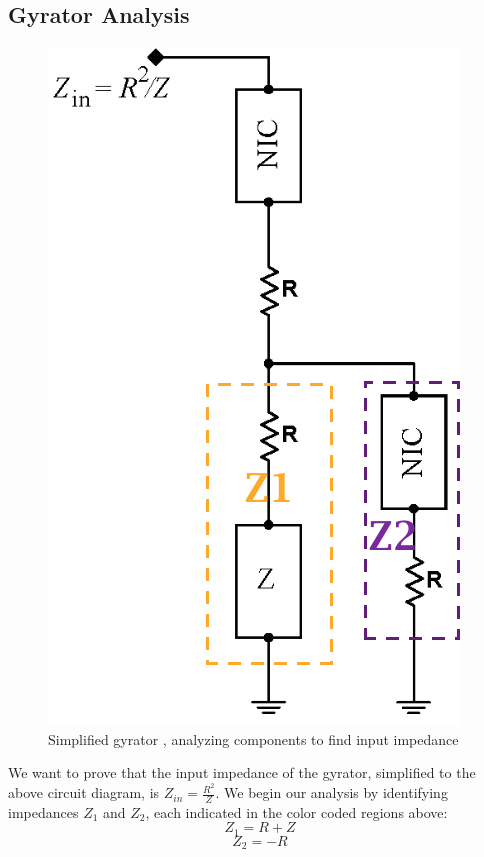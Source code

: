 \documentclass{article}
\begin{document}
    \subsection{Gyrator Analysis}
    \begin{figure}[H]
        \centering
        \includegraphics[scale = 0.6]{14a.png}
        \caption{Simplified gyrator \cite{lab7}, analyzing components to find input impedance}
        \label{fig:my_label}
    \end{figure}
    We want to prove that the input impedance of the gyrator, simplified to the above circuit diagram, is $Z_{in} = \frac{R^{2}}{Z}$. We begin our analysis by identifying impedances $Z_1$ and $Z_2$, each indicated in the color coded regions above:
    \begin{equation}
        Z_1 = R + Z
    \end{equation}
    \begin{equation}
        Z_2 = -R
    \end{equation}
\end{document}
